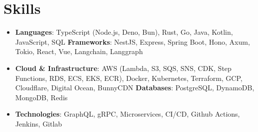 \documentclass[letterpaper,11pt]{article}
\newcommand{\resumeSubHeadingListStart}{\begin{itemize}[leftmargin=*]}
\newcommand{\resumeSubHeadingListEnd}{\end{itemize}}
\begin{document}
\section{Skills}
  \resumeSubHeadingListStart
    \item{
      \textbf{Languages}{: TypeScript (Node.js, Deno, Bun), Rust, Go, Java, Kotlin, JavaScript, SQL}
      \hfill
      \textbf{Frameworks}{: NestJS, Express, Spring Boot, Hono, Axum, Tokio, React, Vue, Langchain, Langgraph}
    }
    \item{
      \textbf{Cloud \& Infrastructure}{: AWS (Lambda, S3, SQS, SNS, CDK, Step Functions, RDS, ECS, EKS, ECR), Docker, Kubernetes, Terraform, GCP, Cloudflare, Digital Ocean, BunnyCDN}
      \hfill
      \textbf{Databases}{: PostgreSQL, DynamoDB, MongoDB, Redis}
    }
    \item{
      \textbf{Technologies}{: GraphQL, gRPC, Microservices, CI/CD, Github Actions, Jenkins, Gitlab}
    }
  \resumeSubHeadingListEnd


\end{document}
